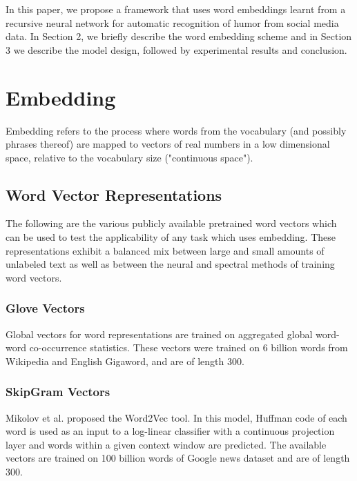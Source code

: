 \documentclass{acm_proc_article-sp}
\begin{document}
In this paper, we propose a framework that uses word embeddings learnt from a recursive neural network for automatic recognition of humor from social media data. In Section 2, we briefly describe the word embedding scheme and in Section 3 we describe the model design, followed by experimental results and conclusion.



\section { Embedding }

Embedding refers to the process where words from the vocabulary (and possibly phrases thereof) are mapped to vectors of real numbers in a low dimensional space, relative to the vocabulary size ("continuous space").

\subsection{Word Vector Representations}

The following are the various publicly available pretrained word vectors which can be used to test the applicability of any task which uses embedding. These representations exhibit a balanced mix between
large and small amounts of unlabeled text as well as between the neural and spectral methods of training word vectors. 

\subsubsection{Glove Vectors}

Global vectors for word representations \cite{pennington2014glove} are trained on aggregated global word-word co-occurrence statistics. These vectors were trained on 6 billion words from Wikipedia and English Gigaword, and are of length 300.


\subsubsection{SkipGram Vectors}

Mikolov et al. \cite{mikolov2013distributed} proposed the Word2Vec tool. In this model, Huffman code of each word is used as an input to a log-linear classifier with a continuous projection layer and words within a given context window are predicted. The available vectors are trained on 100 billion words of Google news dataset and are of length 300. 
\end{document}
